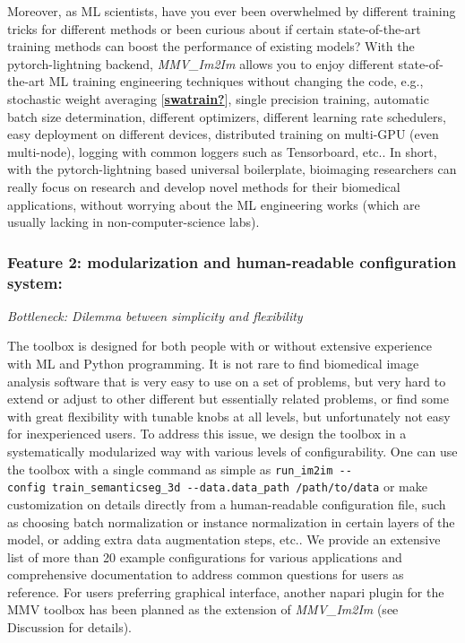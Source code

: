 Moreover, as ML scientists, have you ever been overwhelmed by different training tricks for different methods or been curious about if certain state-of-the-art training methods can boost the performance of existing models? With the pytorch-lightning backend, \emph{MMV\_Im2Im} allows you to enjoy different state-of-the-art ML training engineering techniques without changing the code, e.g., stochastic weight averaging {[}\protect\hyperlink{ref-swatrain}{\textbf{swatrain?}}{]}, single precision training, automatic batch size determination, different optimizers, different learning rate schedulers, easy deployment on different devices, distributed training on multi-GPU (even multi-node), logging with common loggers such as Tensorboard, etc.. In short, with the pytorch-lightning based universal boilerplate, bioimaging researchers can really focus on research and develop novel methods for their biomedical applications, without worrying about the ML engineering works (which are usually lacking in non-computer-science labs).

\hypertarget{feature-2-modularization-and-human-readable-configuration-system}{%
\subsubsection{Feature 2: modularization and human-readable configuration system:}\label{feature-2-modularization-and-human-readable-configuration-system}}

\emph{Bottleneck: Dilemma between simplicity and flexibility}

The toolbox is designed for both people with or without extensive experience with ML and Python programming. It is not rare to find biomedical image analysis software that is very easy to use on a set of problems, but very hard to extend or adjust to other different but essentially related problems, or find some with great flexibility with tunable knobs at all levels, but unfortunately not easy for inexperienced users. To address this issue, we design the toolbox in a systematically modularized way with various levels of configurability. One can use the toolbox with a single command as simple as \texttt{run\_im2im\ -\/-config\ train\_semanticseg\_3d\ -\/-data.data\_path\ /path/to/data} or make customization on details directly from a human-readable configuration file, such as choosing batch normalization or instance normalization in certain layers of the model, or adding extra data augmentation steps, etc.. We provide an extensive list of more than 20 example configurations for various applications and comprehensive documentation to address common questions for users as reference. For users preferring graphical interface, another napari plugin for the MMV toolbox has been planned as the extension of \emph{MMV\_Im2Im} (see Discussion for details).

